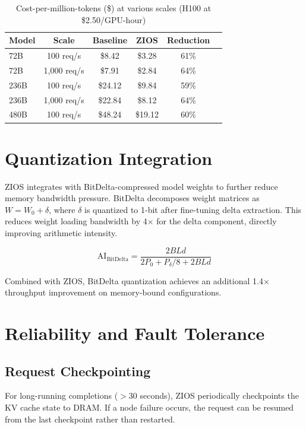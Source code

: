 \documentclass[11pt,a4paper]{article}
\begin{document}
\begin{table}[H]
\centering
\caption{Cost-per-million-tokens (\$) at various scales (H100 at \$2.50/GPU-hour)}
\label{tab:cost}
\begin{tabular}{lccccc}
\toprule
Model & Scale & Baseline & ZIOS & Reduction \\
\midrule
72B & 100 req/s & \$8.42 & \$3.28 & 61\% \\
72B & 1,000 req/s & \$7.91 & \$2.84 & 64\% \\
236B & 100 req/s & \$24.12 & \$9.84 & 59\% \\
236B & 1,000 req/s & \$22.84 & \$8.12 & 64\% \\
480B & 100 req/s & \$48.24 & \$19.12 & 60\% \\
\bottomrule
\end{tabular}
\end{table}

\section{Quantization Integration}

ZIOS integrates with BitDelta-compressed model weights to further reduce memory bandwidth pressure. BitDelta decomposes weight matrices as $W = W_0 + \delta$, where $\delta$ is quantized to 1-bit after fine-tuning delta extraction. This reduces weight loading bandwidth by 4$\times$ for the delta component, directly improving arithmetic intensity.

\begin{equation}
\text{AI}_{\text{BitDelta}} = \frac{2BLd}{2P_0 + P_\delta/8 + 2BLd}
\end{equation}

Combined with ZIOS, BitDelta quantization achieves an additional 1.4$\times$ throughput improvement on memory-bound configurations.

\section{Reliability and Fault Tolerance}

\subsection{Request Checkpointing}

For long-running completions ($>$30 seconds), ZIOS periodically checkpoints the KV cache state to DRAM. If a node failure occurs, the request can be resumed from the last checkpoint rather than restarted.
\end{document}
